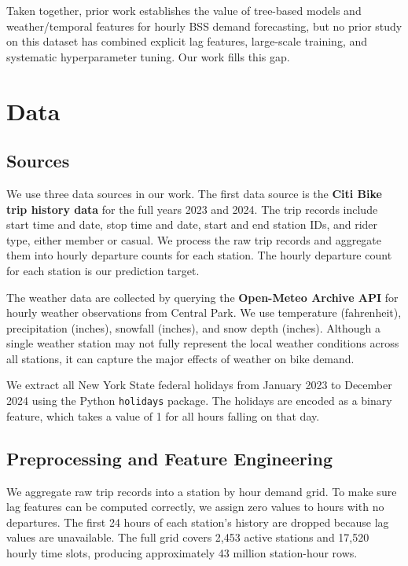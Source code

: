 \documentclass{article}
\begin{document}
Taken together, prior work establishes the value of tree-based models and
weather/temporal features for hourly BSS demand forecasting, but no prior study
on this dataset has combined explicit lag features, large-scale training, and
systematic hyperparameter tuning. Our work fills this gap.

\section{Data}

\subsection{Sources}

We use three data sources in our work. The first data source is the \textbf{Citi Bike trip history data} for the full years 2023 and 2024. The trip records include start time and date, stop time and date, start and end station IDs, and rider type, either member or casual. We process the raw trip records and aggregate them into hourly departure counts for each station. The hourly departure count for each station is our prediction target. 

The weather data are collected by querying the \textbf{Open-Meteo Archive API} for hourly weather observations from Central Park. We use temperature (fahrenheit), precipitation (inches), snowfall (inches), and snow depth (inches). Although a single weather station may not fully represent the local weather conditions across all stations, it can capture the major effects of weather on bike demand. 

We extract all New York State federal holidays from January 2023 to December 2024 using the Python \texttt{holidays} package. The holidays are encoded as a binary feature, which takes a value of 1 for all hours falling on that day.

\subsection{Preprocessing and Feature Engineering}

We aggregate raw trip records into a station by hour demand grid. To make sure lag features can be computed correctly, we assign zero values to hours with no departures. The first 24 hours of each station's history are dropped because lag values are
unavailable. The full grid covers 2,453 active stations and 17,520 hourly time slots, producing approximately 43 million station-hour rows.
\end{document}
